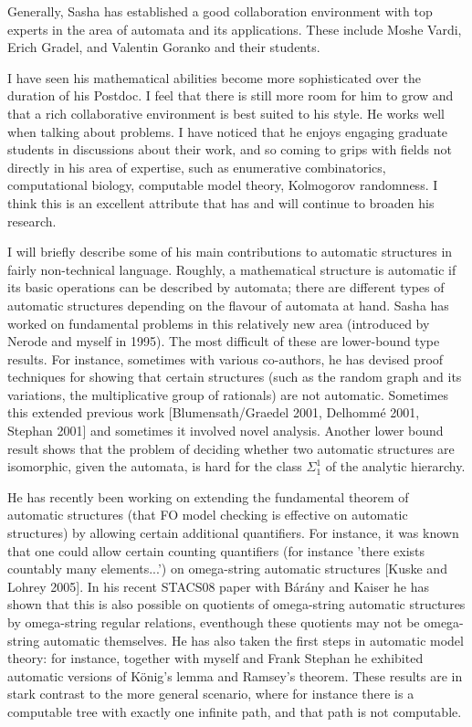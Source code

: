 \documentclass{letter}
\begin{document}
\begin{letter}{}
Generally, Sasha has established a good collaboration environment with top experts in the area of automata and its applications. These include Moshe Vardi, Erich Gradel,
and Valentin Goranko and their students.

\smallskip

I have seen his mathematical abilities become more sophisticated over the duration of his Postdoc. I feel that there is still more room for him to grow and that a rich collaborative environment is best suited to his style. He works well when talking about problems. I have noticed that he enjoys engaging graduate students in discussions about their work, and so coming to grips with fields not directly in his area of expertise, such as enumerative combinatorics, computational biology, computable model theory, Kolmogorov randomness.
I think this is an excellent attribute that has and will continue to broaden his research.

\smallskip

I will briefly describe some of his main contributions to automatic structures in fairly non-technical language. Roughly, a mathematical structure is automatic if its basic
operations can be described by automata; there are different types of automatic structures depending on the flavour of automata at hand. Sasha has worked on fundamental problems in this relatively new area (introduced by Nerode and myself in 1995). The most difficult of these are lower-bound type results. For instance, sometimes with various co-authors, he has devised proof techniques for showing that certain structures (such as the random graph and its variations, the multiplicative group of rationals) are not automatic. Sometimes this extended previous work [Blumensath/Graedel 2001, Delhomm{\'e} 2001, Stephan 2001] and sometimes it involved novel analysis.  Another lower bound result shows that the problem of deciding whether two automatic structures are isomorphic, given the automata, is hard for the class $\Sigma_1^1$ of the analytic hierarchy.

He has recently been working on extending the fundamental theorem of automatic structures (that FO model checking is effective on automatic structures) by allowing certain additional quantifiers. For instance, it was known that one could allow certain counting quantifiers (for instance 'there exists countably many elements...') on omega-string automatic structures [Kuske and Lohrey 2005]. In his recent STACS08 paper with B\'ar\'any and Kaiser he has shown that this is also possible on quotients of omega-string automatic structures by omega-string regular relations, eventhough these quotients may not be omega-string automatic themselves. He has also taken the first steps in automatic model theory: for instance, together with myself and Frank Stephan he exhibited automatic versions of K\"onig's lemma and Ramsey's theorem. These results are in stark contrast to the more general scenario, where for instance there is a computable tree with exactly one infinite path, and that path is not computable.


\end{letter}
\end{document}
